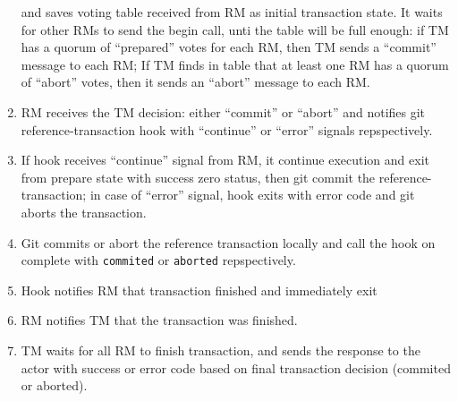 \documentclass[acmlarge, screen, nonacm, 11pt]{acmart}
\newcommand{\code}[1]{\texttt{#1}}
\begin{document}
\begin{enumerate}
      and saves voting table received from RM as initial transaction state. It waits for other RMs to send the
      begin call, unti the table will be full enough: if TM has a quorum of ``prepared'' votes for each RM,
      then TM sends a ``commit'' message to each RM; If TM finds in table that at least one RM has a quorum
      of ``abort'' votes, then it sends an ``abort'' message to each RM.
    \item RM receives the TM decision: either ``commit'' or ``abort'' and notifies git reference-transaction
      hook with ``continue'' or ``error'' signals repspectively.
    \item If hook receives ``continue'' signal from RM, it continue execution and exit from prepare state
      with success zero status, then git commit the reference-transaction;
      in case of ``error'' signal, hook exits with error code and git aborts the transaction.
    \item Git commits or abort the reference transaction locally and call the hook on complete with
      \code{commited} or \code{aborted} repspectively.
    \item Hook notifies RM that transaction finished and immediately exit
    \item RM notifies TM that the transaction was finished.
    \item TM waits for all RM to finish transaction, and sends the response to the actor with success or error
      code based on final transaction decision (commited or aborted).
\end{enumerate}
\end{document}
